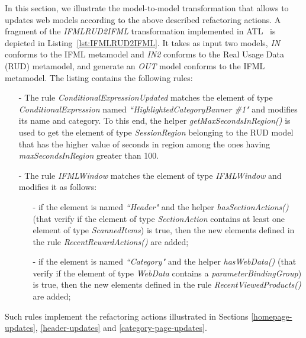 In this section, we illustrate the model-to-model transformation that allows to updates web models according to the above described refactoring actions. A fragment of the \textit{IFMLRUD2IFML} transformation implemented in ATL~\cite{ATL} is depicted in Listing~\ref{lst:IFMLRUD2IFML}. It takes as input two models, \textit{IN}
conforms to the IFML metamodel and  \textit{IN2} conforms to the Real Usage Data (RUD) metamodel, and generate an \textit{OUT} model conforms to the IFML metamodel. The listing contains the following rules: 
\begin{itemize}
	\item[-] The rule \textit{ConditionalExpressionUpdated} matches the element of type \textit{ConditionalExpression} named \textit{``HighlightedCategoryBanner \#1"} and modifies its name and category. To this end, the helper \textit{getMaxSecondsInRegion()} is used to get the element of type \textit{SessionRegion} belonging to the RUD model that has the higher value of seconds in region among the ones having \textit{maxSecondsInRegion} greater than 100.

	\item[-] The rule \textit{IFMLWindow} matches the element of type \textit{IFMLWindow} and modifies it as follows: 
\begin{itemize}
	\item[-] if the element is named \textit{``Header"} and the helper \textit{hasSectionActions()} (that verify if the element of type \textit{SectionAction} contains at least one element of type \textit{ScannedItems}) is true, then the new elements defined in the rule \textit{RecentRewardActions()} are added; 
	\item[-] if the element is named \textit{``Category"} and the helper \textit{hasWebData()} (that verify if the element of type \textit{WebData} contains a  \textit{parameterBindingGroup}) is true, then the new elements defined in the rule \textit{RecentViewedProducts()} are added; 
\end{itemize} 
\end{itemize}

Such rules implement the refactoring actions illustrated in Sections \ref{homepage-updates}, \ref{header-updates} and \ref{category-page-updates}.
\vspace{0.5cm}

